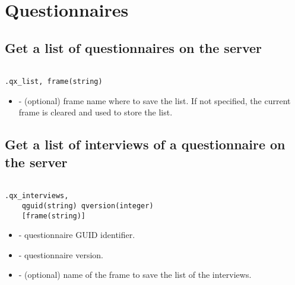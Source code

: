 \section{Questionnaires}

\subsection{Get a list of questionnaires on the server}
\begin{lstlisting}[style=CommandLineStyle, showlines=true]

.qx_list, frame(string)

\end{lstlisting}

\optsheader
\begin{itemize}
  \item {} - (optional) frame name where to save the list. If not
  specified, the current frame is cleared and used to store the list.
\end{itemize}

\begin{compactitem}
\end{compactitem}


\subsection{Get a list of interviews of a questionnaire on the server}

\begin{lstlisting}[style=CommandLineStyle, showlines=true]

.qx_interviews,
    qguid(string) qversion(integer)
    [frame(string)]

\end{lstlisting}

\optsheader
\begin{itemize}
  \item {} - questionnaire GUID identifier.
  \item {} - questionnaire version.
  \item {} - (optional) name of the frame to save the list of the
  interviews.
\end{itemize}

